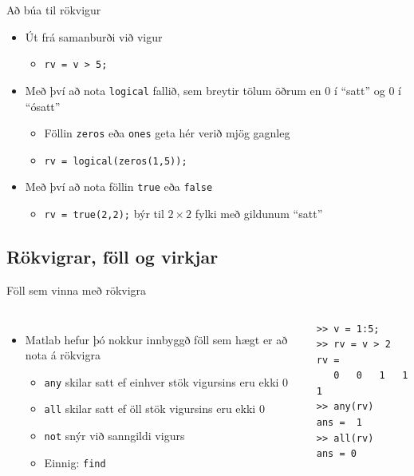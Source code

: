 \documentclass[handout]{beamer}
\begin{document}
\begin{frame}{Að búa til rökvigur}
\begin{itemize}
 \item Út frá samanburði við vigur
 \begin{itemize}
  \item \texttt{rv = v > 5;}
 \end{itemize}
 \item Með því að nota \texttt{logical} fallið, sem breytir tölum öðrum en 0 í ``satt'' og 0 í ``ósatt''
 \begin{itemize}
  \item Föllin \texttt{zeros} eða \texttt{ones} geta hér verið mjög gagnleg
  \item \texttt{rv = logical(zeros(1,5));}
 \end{itemize}
 \item Með því að nota föllin \texttt{true} eða \texttt{false}
 \begin{itemize}
  \item \texttt{rv = true(2,2);} býr til $2 \times 2$ fylki með gildunum ``satt''
 \end{itemize}
\end{itemize}
\end{frame}

\subsection{Rökvigrar, föll og virkjar}
\begin{frame}[fragile]{Föll sem vinna með rökvigra}
\begin{columns}
\begin{itemize}
 \item Matlab hefur þó nokkur innbyggð föll sem hægt er að nota á rökvigra
 \begin{itemize}
  \item \texttt{any} skilar satt ef einhver stök vigursins eru ekki $0$
  \item \texttt{all} skilar satt ef öll stök vigursins eru ekki $0$
  \item \texttt{not} snýr við sanngildi vigurs
  \item Einnig: \texttt{find}
 \end{itemize}
\end{itemize}
\begin{verbatim}
>> v = 1:5;
>> rv = v > 2
rv =
   0   0   1   1   1
>> any(rv)
ans =  1
>> all(rv)
ans = 0
\end{verbatim}
\end{columns}
\end{frame}
\end{document}
